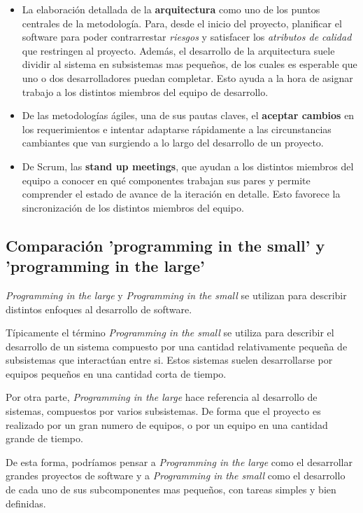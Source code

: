 \begin{itemize}
		\item La elaboración detallada de la \textbf{arquitectura} como uno de los puntos centrales de la metodología. Para, desde el inicio del proyecto, planificar el software para poder contrarrestar \emph{riesgos} y satisfacer los \emph{atributos de calidad} que restringen al proyecto. Además, el desarrollo de la arquitectura suele dividir al sistema en subsistemas mas pequeños, de los cuales es esperable que uno o dos desarrolladores puedan completar. Esto ayuda a la hora de asignar trabajo a los distintos miembros del equipo de desarrollo.

		\item De las metodologías ágiles, una de sus pautas claves, el \textbf{aceptar cambios} en los requerimientos e intentar adaptarse rápidamente a las circunstancias cambiantes que van surgiendo a lo largo del desarrollo de un proyecto.

		\item De Scrum, las \textbf{stand up meetings}, que ayudan a los distintos miembros del equipo a conocer en qué componentes trabajan sus pares y permite comprender el estado de avance de la iteración en detalle. Esto favorece la sincronización de los distintos miembros del equipo.

	\end{itemize}

\subsection{Comparación 'programming in the small' y 'programming in the large'}

	\newcommand{\pil}{
		\emph{Programming in the large}
	}

	\newcommand{\pis}{
		\emph{Programming in the small}
	}

	\pil y \pis se utilizan para describir distintos enfoques al desarrollo de software.

	Típicamente el término \pis se utiliza para describir el desarrollo de un sistema compuesto por una cantidad relativamente pequeña de subsistemas que interactúan entre si. Estos sistemas suelen desarrollarse por equipos pequeños en una cantidad corta de tiempo.

	Por otra parte, \pil hace referencia al desarrollo de sistemas, compuestos por varios subsistemas. De forma que el proyecto es realizado por un gran numero de equipos, o por un equipo en una cantidad grande de tiempo.

	De esta forma, podríamos pensar a \pil como el desarrollar grandes proyectos de software y a \pis como el desarrollo de cada uno de sus subcomponentes mas pequeños, con tareas simples y bien definidas.

